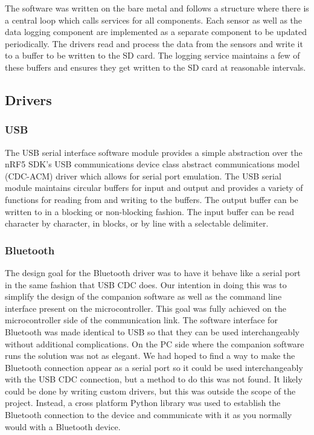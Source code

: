 The software was written on the bare metal and follows a structure where there
is a central loop which calls services for all components.  Each sensor as well
as the data logging component are implemented as a separate component
to be updated periodically. The drivers read and process the data from the
sensors and write it to a buffer to be written to the SD card. The logging service
maintains a few of these buffers and ensures they get written to the SD card
at reasonable intervals.

\subsection{Drivers}

\subsubsection{USB}

The USB serial interface software module provides a simple abstraction over the
nRF5 SDK's USB communications device class abstract communications model
(CDC-ACM) driver which allows for serial port emulation. The USB serial module
maintains circular buffers for input and output and provides a variety of
functions for reading from and writing to the buffers. The output buffer can be
written to in a blocking or non-blocking fashion. The input buffer can be read
character by character, in blocks, or by line with a selectable delimiter.

\subsubsection{Bluetooth}

The design goal for the Bluetooth driver was to have it behave like a serial
port in the same fashion that USB CDC does. Our intention in doing this was to 
simplify the design of the companion software as well as the command line 
interface present on the microcontroller. This goal was fully achieved 
on the microcontroller side of the communication link. The software interface for 
Bluetooth was made identical to USB so that they can be used interchangeably 
without additional complications. On the PC side where the companion software
runs the solution was not as elegant. We had hoped to find a way to make the
Bluetooth connection appear as a serial port so it could be used interchangeably
with the USB CDC connection, but a method to do this was not found. It likely
could be done by writing custom drivers, but this was outside the scope of the
project. Instead, a cross platform Python library was used to establish the
Bluetooth connection to the device and communicate with it as you normally
would with a Bluetooth device.

